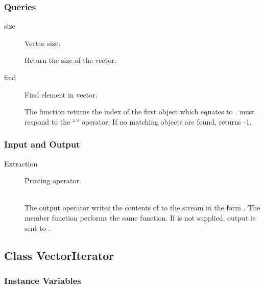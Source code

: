 \subsubsection{Queries}
\label{sec:vector-queries}

\begin{description}

\item[size] \texonly{---} Vector size.\\

Return the size of the vector.

\item[find] \texonly{---} Find element in vector.\\

The  function returns the index of the first object which
equates to .   must respond to the ``\code{==}''
operator.  If no matching objects are found,  returns -1.
\end{description}

\subsubsection{Input and Output}
\label{sec:vector-io}

\begin{description}
\item[Extraction] \texonly{---} Printing operator.\\
\\

The output operator \code{< <} writes the contents of  to
the stream  in the form .  The member
function  performs the same function.  If  is
not supplied, output is sent to .
\end{description}

\subsection{Class VectorIterator}
\label{sec:vector-iterator}


\subsubsection{Instance Variables}

